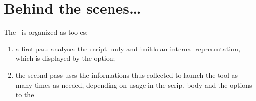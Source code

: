 \section{Behind the scenes\dots}

The \mfslInterp\ is organized as too \pass es:
\begin{enumerate}
\item a first pass analyses the script body and builds an internal representation, which is displayed by the  option;

\item the second pass uses the informations thus collected to launch the tool as many times as needed, depending on   usage in the script body and the  options to the \mfslInterp.
\end{enumerate}
